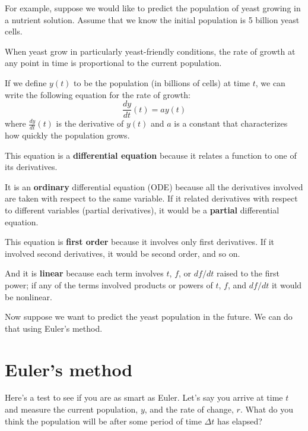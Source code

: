 \documentclass[
]{book}
\numberwithin{Answer}{chapter}
\numberwithin{Exercise}{chapter}
\begin{document}
For example, suppose we would like to predict the population of yeast growing in a nutrient solution.  Assume that we know the initial population is 5 billion yeast cells.

When yeast grow in particularly yeast-friendly
conditions, the rate of growth at any point in time is proportional to
the current population.

If we define $y(t)$ to be the population (in billions of cells) at 
time $t$, we can write the following equation for the rate of growth:
%
\begin{equation}
\label{eq:exp_growth}
\frac{dy}{dt}(t) = a y(t)
\end{equation}
%
where $\frac{dy}{dt}(t)$ is the derivative of $y(t)$ and
$a$ is a constant that characterizes how quickly the population
grows.

This equation is a {\bf differential equation} because it relates a function to one of its derivatives.

It is an {\bf ordinary} differential equation (ODE) because all the
derivatives involved are taken with respect to the
same variable.
If it related derivatives with respect to
different variables (partial derivatives), it would be a {\bf partial}
differential equation.


This equation is {\bf first order} because it involves only first
derivatives.  If it involved second derivatives, it would be second order,
and so on.


And it is {\bf linear} because each term involves $t$, $f$, or
$df/dt$ raised to the first power; if any of the terms involved
products or powers of $t$, $f$, and $df/dt$ it would be
nonlinear.


Now suppose we want to predict the yeast population in the future.  We can do that using Euler's method.


\section{Euler's method}

Here's a test to see if you are as smart as Euler.  Let's say  you arrive at time $t$ and measure the current population, $y$, and
the rate of change, $r$.  What do you think the population will
be after some period of time $\Delta t$ has elapsed?
\end{document}

